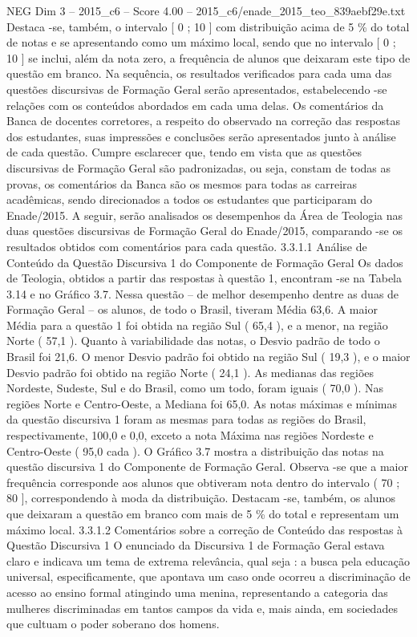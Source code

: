 \begin{textsample}{NEG Dim 3 – 2015\_c6 – Score 4.00 – 2015\_c6/enade\_2015\_teo\_839aebf29e.txt}
Destaca -se, também, o intervalo [ 0 ; 10 ] com distribuição acima de 5 \% do total de notas e se apresentando como um máximo local, sendo que no intervalo [ 0 ; 10 ] se inclui, além da nota zero, a frequência de alunos que deixaram este tipo de questão em branco.
Na sequência, os resultados verificados para cada uma das questões discursivas de Formação Geral serão apresentados, estabelecendo -se relações com os conteúdos abordados em cada uma delas.
Os comentários da Banca de docentes corretores, a respeito do observado na correção das respostas dos estudantes, suas impressões e conclusões serão apresentados junto à análise de cada questão.
Cumpre esclarecer que, tendo em vista que as questões discursivas de Formação Geral são padronizadas, ou seja, constam de todas as provas, os comentários da Banca são os mesmos para todas as carreiras acadêmicas, sendo direcionados a todos os estudantes que participaram do Enade/2015.
A seguir, serão analisados os desempenhos da Área de Teologia nas duas questões discursivas de Formação Geral do Enade/2015, comparando -se os resultados obtidos com comentários para cada questão. 3.3.1.1 Análise de Conteúdo da Questão Discursiva 1 do Componente de Formação Geral Os dados de Teologia, obtidos a partir das respostas à questão 1, encontram -se na Tabela 3.14 e no Gráfico 3.7.
Nessa questão – de melhor desempenho dentre as duas de Formação Geral – os alunos, de todo o Brasil, tiveram Média 63,6.
A maior Média para a questão 1 foi obtida na região Sul ( 65,4 ), e a menor, na região Norte ( 57,1 ).
Quanto à variabilidade das notas, o Desvio padrão de todo o Brasil foi 21,6.
O menor Desvio padrão foi obtido na região Sul ( 19,3 ), e o maior Desvio padrão foi obtido na região Norte ( 24,1 ).
As medianas das regiões Nordeste, Sudeste, Sul e do Brasil, como um todo, foram iguais ( 70,0 ).
Nas regiões Norte e Centro-Oeste, a Mediana foi 65,0.
As notas máximas e mínimas da questão discursiva 1 foram as mesmas para todas as regiões do Brasil, respectivamente, 100,0 e 0,0, exceto a nota Máxima nas regiões Nordeste e Centro-Oeste ( 95,0 cada ).
O Gráfico 3.7 mostra a distribuição das notas na questão discursiva 1 do Componente de Formação Geral.
Observa -se que a maior frequência corresponde aos alunos que obtiveram nota dentro do intervalo ( 70 ; 80 ], correspondendo à moda da distribuição.
Destacam -se, também, os alunos que deixaram a questão em branco com mais de 5 \% do total e representam um máximo local. 3.3.1.2 Comentários sobre a correção de Conteúdo das respostas à Questão Discursiva 1 O enunciado da Discursiva 1 de Formação Geral estava claro e indicava um tema de extrema relevância, qual seja : a busca pela educação universal, especificamente, que apontava um caso onde ocorreu a discriminação de acesso ao ensino formal atingindo uma menina, representando a categoria das mulheres discriminadas em tantos campos da vida e, mais ainda, em sociedades que cultuam o poder soberano dos homens.

\end{textsample}
